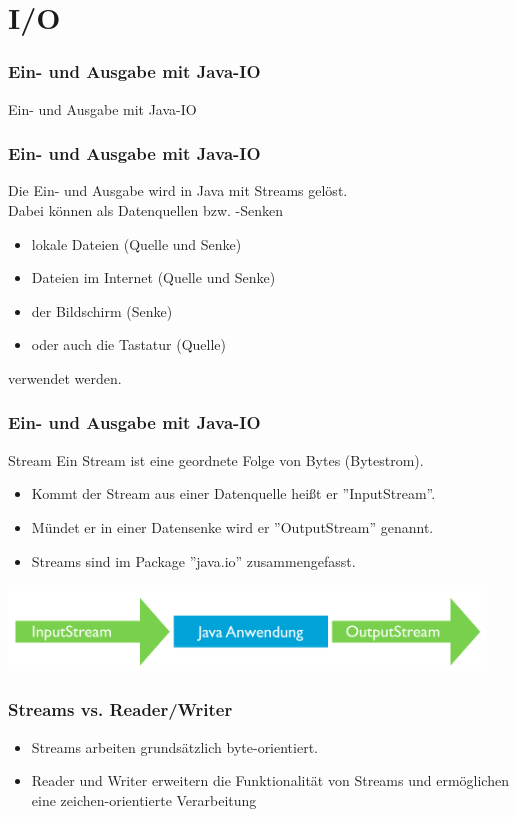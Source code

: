 \section{I/O}
\begin{frame}
\frametitle{Ein- und Ausgabe mit Java-IO}
	\huge Ein- und Ausgabe mit Java-IO
\end{frame}

\begin{frame}
\frametitle{Ein- und Ausgabe mit Java-IO}
	Die Ein- und Ausgabe wird in Java mit Streams gelöst.
	\\ \vspace{0,3cm}
	Dabei können als Datenquellen bzw. -Senken 
	\begin{itemize}
	  \item lokale Dateien (Quelle und Senke)
	  \item Dateien im Internet (Quelle und Senke)
	  \item der Bildschirm (Senke)
	  \item oder auch die Tastatur (Quelle)
	\end{itemize}
	verwendet werden.
\end{frame}

\begin{frame}
\frametitle{Ein- und Ausgabe mit Java-IO}
	\begin{block}{Stream}
	Ein Stream ist eine geordnete Folge von Bytes (Bytestrom).
	\begin{itemize}
	  \item Kommt der Stream aus einer Datenquelle heißt er ''InputStream''.
	  \item Mündet er in einer Datensenke wird er ''OutputStream'' genannt.
	  \item Streams sind im Package ''java.io'' zusammengefasst.
	\end{itemize}
	\end{block}
	\center
	\includegraphics[width=0.95\textwidth,
	keepaspectratio=true]{bilder/streams.png}
\end{frame}


\begin{frame}
\frametitle{Streams vs. Reader/Writer}
	\begin{itemize}
	  \item Streams arbeiten grundsätzlich byte-orientiert.
	  \item Reader und Writer erweitern die Funktionalität von Streams und
		ermöglichen eine zeichen-orientierte Verarbeitung
	\end{itemize}
\end{frame}

